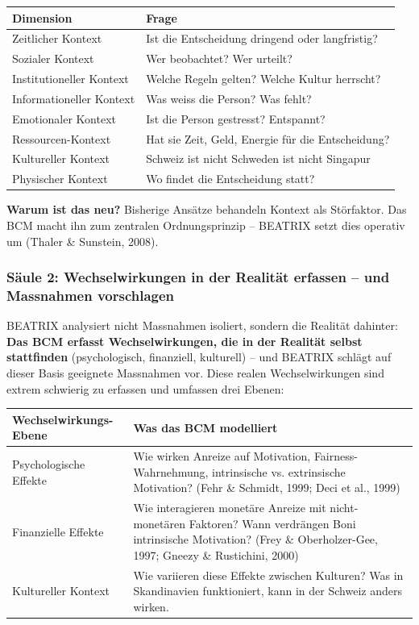 \documentclass[11pt,a4paper]{article}
\begin{document}
\begin{table}[h]
\centering
\begin{tabular}{@{}L{4cm}L{9cm}@{}}
\toprule
\textbf{Dimension} & \textbf{Frage} \\
\midrule
Zeitlicher Kontext & Ist die Entscheidung dringend oder langfristig? \\
Sozialer Kontext & Wer beobachtet? Wer urteilt? \\
Institutioneller Kontext & Welche Regeln gelten? Welche Kultur herrscht? \\
Informationeller Kontext & Was weiss die Person? Was fehlt? \\
Emotionaler Kontext & Ist die Person gestresst? Entspannt? \\
Ressourcen-Kontext & Hat sie Zeit, Geld, Energie für die Entscheidung? \\
Kultureller Kontext & Schweiz ist nicht Schweden ist nicht Singapur \\
Physischer Kontext & Wo findet die Entscheidung statt? \\
\bottomrule
\end{tabular}
\end{table}

\textbf{Warum ist das neu?} Bisherige Ansätze behandeln Kontext als Störfaktor. Das BCM macht ihn zum zentralen Ordnungsprinzip -- BEATRIX setzt dies operativ um (Thaler \& Sunstein, 2008).

\subsubsection{Säule 2: Wechselwirkungen in der Realität erfassen -- und Massnahmen vorschlagen}

BEATRIX analysiert nicht Massnahmen isoliert, sondern die Realität dahinter: \textbf{Das BCM erfasst Wechselwirkungen, die in der Realität selbst stattfinden} (psychologisch, finanziell, kulturell) -- und BEATRIX schlägt auf dieser Basis geeignete Massnahmen vor. Diese realen Wechselwirkungen sind extrem schwierig zu erfassen und umfassen drei Ebenen:

\begin{table}[h]
\centering
\begin{tabular}{@{}L{4cm}L{9cm}@{}}
\toprule
\textbf{Wechselwirkungs-Ebene} & \textbf{Was das BCM modelliert} \\
\midrule
Psychologische Effekte & Wie wirken Anreize auf Motivation, Fairness-Wahrnehmung, intrinsische vs. extrinsische Motivation? (Fehr \& Schmidt, 1999; Deci et al., 1999) \\
Finanzielle Effekte & Wie interagieren monetäre Anreize mit nicht-monetären Faktoren? Wann verdrängen Boni intrinsische Motivation? (Frey \& Oberholzer-Gee, 1997; Gneezy \& Rustichini, 2000) \\
Kultureller Kontext & Wie variieren diese Effekte zwischen Kulturen? Was in Skandinavien funktioniert, kann in der Schweiz anders wirken. \\
\bottomrule
\end{tabular}
\end{table}
\end{document}
